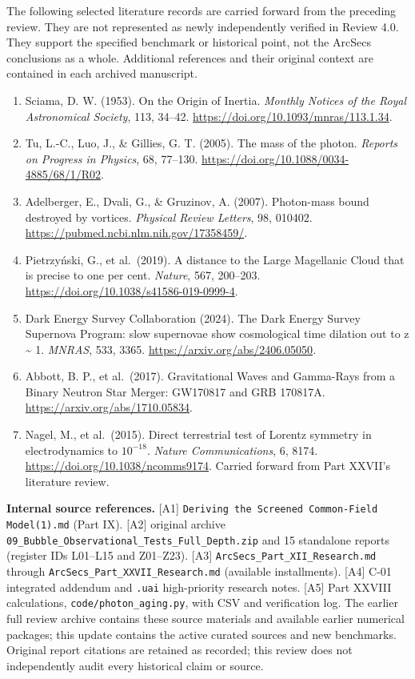 \documentclass[
  11pt,
  twoside]{article}
\providecommand{\tightlist}{%
  \setlength{\itemsep}{0pt}\setlength{\parskip}{0pt}}
\begin{document}
The following selected literature records are carried forward from the
preceding review. They are not represented as newly independently
verified in Review 4.0. They support the specified benchmark or
historical point, not the ArcSecs conclusions as a whole. Additional
references and their original context are contained in each archived
manuscript.

\begin{enumerate}
\def\labelenumi{\arabic{enumi}.}
\tightlist
\item
  Sciama, D. W. (1953). On the Origin of Inertia. \emph{Monthly Notices
  of the Royal Astronomical Society}, 113, 34--42.
  \url{https://doi.org/10.1093/mnras/113.1.34}.
\item
  Tu, L.-C., Luo, J., \& Gillies, G. T. (2005). The mass of the photon.
  \emph{Reports on Progress in Physics}, 68, 77--130.
  \url{https://doi.org/10.1088/0034-4885/68/1/R02}.
\item
  Adelberger, E., Dvali, G., \& Gruzinov, A. (2007). Photon-mass bound
  destroyed by vortices. \emph{Physical Review Letters}, 98, 010402.
  \url{https://pubmed.ncbi.nlm.nih.gov/17358459/}.
\item
  Pietrzyński, G., et al.~(2019). A distance to the Large Magellanic
  Cloud that is precise to one per cent. \emph{Nature}, 567, 200--203.
  \url{https://doi.org/10.1038/s41586-019-0999-4}.
\item
  Dark Energy Survey Collaboration (2024). The Dark Energy Survey
  Supernova Program: slow supernovae show cosmological time dilation out
  to z \textasciitilde{} 1. \emph{MNRAS}, 533, 3365.
  \url{https://arxiv.org/abs/2406.05050}.
\item
  Abbott, B. P., et al.~(2017). Gravitational Waves and Gamma-Rays from
  a Binary Neutron Star Merger: GW170817 and GRB 170817A.
  \url{https://arxiv.org/abs/1710.05834}.
\item
  Nagel, M., et al.~(2015). Direct terrestrial test of Lorentz symmetry
  in electrodynamics to \(10^{-18}\). \emph{Nature Communications}, 6,
  8174. \url{https://doi.org/10.1038/ncomms9174}. Carried forward from
  Part XXVII's literature review.
\end{enumerate}

\textbf{Internal source references.} {[}A1{]}
\nolinkurl{Deriving the Screened Common-Field Model(1).md} (Part IX).
{[}A2{]} original archive
\nolinkurl{09_Bubble_Observational_Tests_Full_Depth.zip} and 15
standalone reports (register IDs L01--L15 and Z01--Z23). {[}A3{]}
\nolinkurl{ArcSecs_Part_XII_Research.md} through
\nolinkurl{ArcSecs_Part_XXVII_Research.md} (available installments).
{[}A4{]} C-01 integrated addendum and \texttt{.uai} high-priority
research notes. {[}A5{]} Part XXVIII calculations,
\nolinkurl{code/photon_aging.py}, with CSV and verification log. The
earlier full review archive contains these source materials and
available earlier numerical packages; this update contains the active
curated sources and new benchmarks. Original report citations are
retained as recorded; this review does not independently audit every
historical claim or source.
\end{document}
